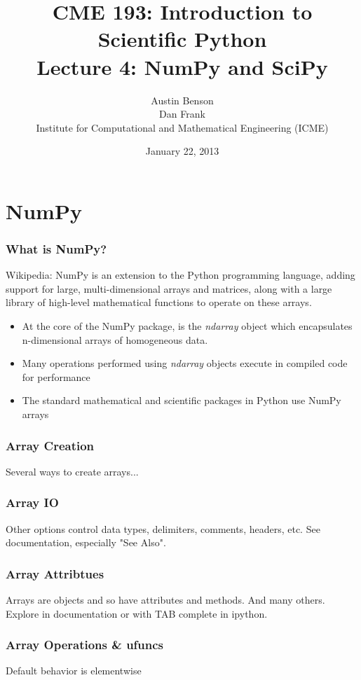 \documentclass{beamer}
\title{CME 193: Introduction to Scientific Python \\
Lecture 4: NumPy and SciPy}
\author{Austin Benson \\
\vspace{0.1in}
Dan Frank \\
\vspace{0.1in}
Institute for Computational and Mathematical Engineering (ICME)}
\date{January 22, 2013}
\begin{document}
\maketitle

\section{NumPy}

\begin{frame}
\frametitle{What is NumPy?}

Wikipedia: NumPy is an extension to the Python programming language, adding support for large, multi-dimensional arrays and matrices, along with a large library of high-level mathematical functions to operate on these arrays.

\begin{itemize}
\setlength{\itemsep}{0.1in}
\item{At the core of the NumPy package, is the \textit{ndarray} object which encapsulates n-dimensional arrays of homogeneous data. 
}
\item{Many operations performed using \textit{ndarray} objects execute in compiled code for performance}
\item{The standard mathematical and scientific packages in Python use NumPy arrays}
\end{itemize}
\end{frame}

\begin{frame}
\frametitle{Array Creation}
Several ways to create arrays...
\lstset{basicstyle=\scriptsize}
\end{frame}

\begin{frame}
\frametitle{Array IO}
\lstset{basicstyle=\small}
Other options control data types, delimiters, comments, headers, etc.
See documentation, especially "See Also".
\end{frame}

\begin{frame}
\frametitle{Array Attribtues}
Arrays are objects and so have attributes and methods.
And many others. Explore in documentation or with TAB complete in ipython.
\end{frame}

\begin{frame}
\frametitle{Array Operations \& ufuncs}
Default behavior is elementwise 
\lstset{basicstyle=\scriptsize}
\end{frame}
\end{document}
